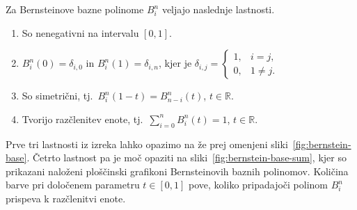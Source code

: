 \documentclass[isrm2, tisk]{fmfdelo}
\newcommand{\R}{\mathbb R}
\newcommand{\bernstein}[2]{\binom{#1}{#2}t^{#2}(1-t)^{#1-#2}}
\begin{document}
    \begin{izrek}
        Za Bernsteinove bazne polinome $B_i^n$ veljajo naslednje lastnosti.
        \label{izrek:bernsteinovi_lastnosti}
        \begin{enumerate}
            \item So nenegativni na intervalu $[0,1]$.\label{izrek:bernsteinovi_lastnosti:pozitivnost}
            \item $B_i^n(0) = \delta_{i,0}$ in $B_i^n(1) = \delta_{i,n}$, kjer je $\delta_{i,j} = \begin{cases}
                                                                                                      1, & i=j, \\
                                                                                                      0, & 1\neq j.
            \end{cases}$
            \item So simetrični, tj.\ $B_i^n(1-t) = B^n_{n-i}(t)$, $t\in\R$. \label{izrek:bernsteinovi_lastnosti:simetrija}
            \item Tvorijo razčlenitev enote, tj.\  $\sum_{i=0}^{n}B_{i}^{n}(t) = 1$, $t\in\R$.\label{izrek:bernsteinovi_lastnosti:enota}
        \end{enumerate}
    \end{izrek}
    \noindent Prve tri lastnosti iz izreka lahko opazimo na že prej omenjeni sliki~\ref{fig:bernstein-base}.
    Četrto lastnost pa je moč opaziti na sliki~\ref{fig:bernstein-base-sum}, kjer so prikazani naloženi ploščinski grafikoni Bernsteinovih baznih polinomov. %
    Količina barve pri določenem parametru $t\in[0,1]$ pove, koliko pripadajoči polinom $B_i^n$ prispeva k razčlenitvi enote.
\end{document}
